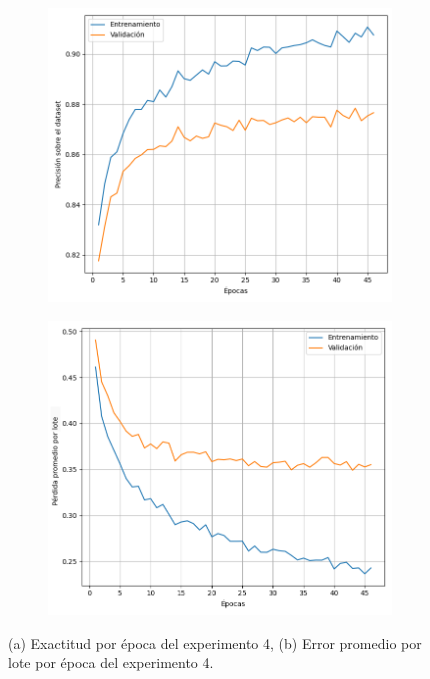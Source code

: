 \documentclass[aps,twocolumn,groupedaddress]{revtex4-2}
\begin{document}
\begin{figure}[htbp]  %
  \centering
  \begin{subfigure}[b]{0.45\textwidth}
    \centering
    \includegraphics[scale=.22]{figs/exp4/exp4_acc.png}
    \caption{}
    \label{fig:exp4_acc}
  \end{subfigure}
  \hspace{0.05\textwidth}
  \begin{subfigure}[b]{0.45\textwidth}
    \centering
    \includegraphics[scale=.22]{figs/exp4/exp4_loss.png}
    \caption{}
    \label{fig:exp4_loss}
  \end{subfigure}
  \caption{(a) Exactitud por época del experimento 4, (b) Error promedio por lote por época del experimento 4.}
  \label{fig:exp4}
\end{figure}
\end{document}
